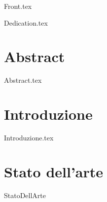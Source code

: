 \documentclass[12pt,onesidet]{report}
\begin{document}
	
	\begin{titlepage}
     {Front.tex}
    \end{titlepage}

  
    {Dedication.tex}
    
    
    \chapter*{Abstract}
     {Abstract.tex}
    
    \newpage  
    
    \tableofcontents{}
    \listoftables
    \listoflistings
    
    
    \chapter{Introduzione}
     {Introduzione.tex}
    
    \chapter{Stato dell'arte}
    {StatoDellArte}
    
    
     
    
   
    
\end{document}
